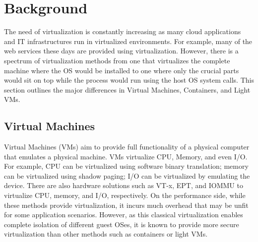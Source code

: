 \section{Background}
\label{sec:background}
%
The need of virtualization is constantly increasing as many cloud applications and IT infrastructures run in virtualized environments.
%
For example, many of the web services these days are provided using virtualization.
%
However, there is a spectrum of virtualization methods from one that virtualizes the complete machine where the OS would be installed to one where only the crucial parts would sit on top while the process would run using the host OS system calls.
%
This section outlines the major differences in Virtual Machines, Containers, and Light VMs.

\subsection{Virtual Machines}
%
Virtual Machines (VMs) aim to provide full functionality of a physical computer that emulates a physical machine.
%
VMs virtualize CPU, Memory, and even I/O.
%
For example, CPU can be virtualized using software binary translation; memory can be virtualized using shadow paging; I/O can be virtualized by emulating the device.
%
There are also hardware solutions such as VT-x, EPT, and IOMMU to virtualize CPU, memory, and I/O, respectively.
%
On the performance side, while these methods provide virtualization, it incurs much overhead that may be unfit for some application scenarios.
%
However, as this classical virtualization enables complete isolation of different guest OSes, it is known to provide more secure virtualization than other methods such as containers or light VMs.


